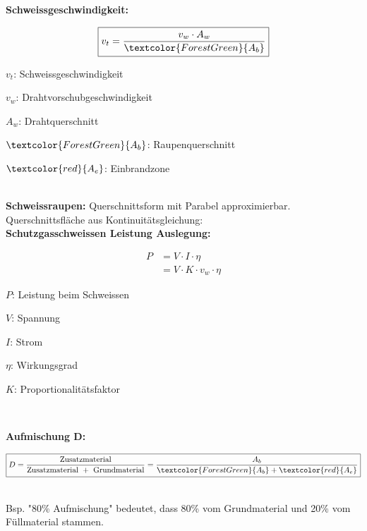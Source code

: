 \textbf{Schweissgeschwindigkeit:}\\
\begin{minipage}{0.5\linewidth}
    \[
    \boxed{     
        v_t = \frac{v_w \cdot A_{w}}{\textcolor{ForestGreen}{A_{b}}}
    }
    \]
\end{minipage}
\begin{minipage}{0.5\linewidth}
    \begin{tiny}
    \item $v_{t}$: Schweissgeschwindigkeit
    \item $v_w$: Drahtvorschubgeschwindigkeit
    \item $A_w$: Drahtquerschnitt
    \item $\textcolor{ForestGreen}{A_b}$: Raupenquerschnitt
    \item $\textcolor{red}{A_e}$: Einbrandzone
    \end{tiny}
\end{minipage}\\
\textbf{Schweissraupen:} Querschnittsform mit Parabel approximierbar.\\
Querschnittsfläche aus Kontinuitätsgleichung:\\

\textbf{Schutzgasschweissen Leistung Auslegung:}\\

\begin{minipage}{0.5\linewidth}
    \[
    \boxed{     
        \begin{aligned}
            P &= V \cdot I \cdot \eta \\
            &= V \cdot K \cdot v_{w} \cdot \eta
        \end{aligned}    
        }
    \]
\end{minipage}
\begin{minipage}{0.5\linewidth}
    \begin{tiny}
    \item $P$: Leistung beim Schweissen
    \item $V$: Spannung
    \item $I$: Strom
    \item $\eta$: Wirkungsgrad
    \item $K$: Proportionalitätsfaktor
    \end{tiny}
\end{minipage}\\
\vspace{1mm}


\textbf{Aufmischung D:} 
    \begin{tiny}
 \[
    \boxed{     
        D=\frac{\text{Zusatzmaterial}}{\text{Zusatzmaterial } + \text{ Grundmaterial}} = \frac{A_b}{\textcolor{ForestGreen}{A_b} + \textcolor{red}{A_e}}
    }
    \]
    \end{tiny}\\
Bsp. "80\% Aufmischung" bedeutet, dass 80\% vom Grundmaterial 
und 20\% vom Füllmaterial stammen.\\

